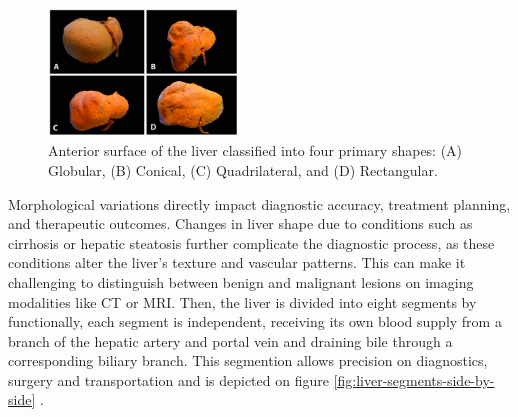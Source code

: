 \documentclass[11pt]{article} %
\begin{document}
\begin{multicols}{2}
\begin{figure}[ht]
	\centering
	\includegraphics[width=0.45\textwidth]{assets/diagnostics-13-02371-g001.png} %
	\caption{Anterior surface of the liver classified into four primary shapes: (A) Globular, (B) Conical, (C) Quadrilateral, and (D) Rectangular.}
	\label{fig:liver-shapes}
\end{figure}

Morphological variations directly impact diagnostic accuracy, treatment planning, and therapeutic outcomes. Changes in liver shape due to conditions such as cirrhosis or hepatic steatosis further complicate the diagnostic process, as these conditions alter the liver’s texture and vascular patterns. This can make it challenging to distinguish between benign and malignant lesions on imaging modalities like CT or MRI. Then, the liver is divided into eight segments by functionally, each segment is independent, receiving its own blood supply from a branch of the hepatic artery and portal vein and draining bile through a corresponding biliary branch. This segmention allows precision on diagnostics, surgery and transportation and is depicted on figure \ref{fig:liver-segments-side-by-side} \cite{diagnostics13142371}.


\end{multicols}
\end{document}
